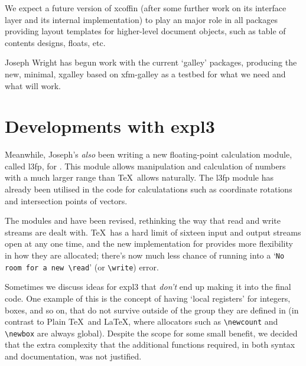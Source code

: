 \documentclass{ltnews}
\begin{document}
We expect a future version of \textsf{xcoffin} (after some further work on its
interface layer and its internal implementation) to play an major role in all
packages providing layout templates for higher-level document objects, such as
table of contents designs, floats, etc.

Joseph Wright has begun work with the current `galley' packages, producing the
new, minimal, \textsf{xgalley} based on \textsf{xfm-galley} as a testbed for
what we need and what will work.


\section{Developments with \textsf{expl3}}

Meanwhile, Joseph's \emph{also} been writing a new floating-point calculation
module, called \textsf{l3fp}, for . This module allows manipulation
and calculation of numbers with a much larger range than \TeX\ allows
naturally. The \textsf{l3fp} module has already been utilised in the
 code for calculatations such as coordinate rotations and
intersection points of vectors.

The modules  and  have been revised, rethinking the way
that read and write streams are dealt with. \TeX\ has a hard limit of sixteen
input and output streams open at any one time, and the new implementation for
 provides more flexibility in how they are allocated; there's now
much less chance of running into a `\verb|No room for a new \read|' (or
\verb|\write|) error.

Sometimes we discuss ideas for \textsf{expl3} that \emph{don't} end up making
it into the final code. One example of this is the concept of having `local
registers' for integers, boxes, and so on, that do not survive outside of the
group they are defined in (in contrast to Plain \TeX\ and \LaTeX, where
allocators such as \verb|\newcount| and \verb|\newbox| are always global).
Despite the scope for some small benefit, we decided that the extra complexity
that the additional functions required, in both syntax and documentation, was
not justified.
\end{document}
